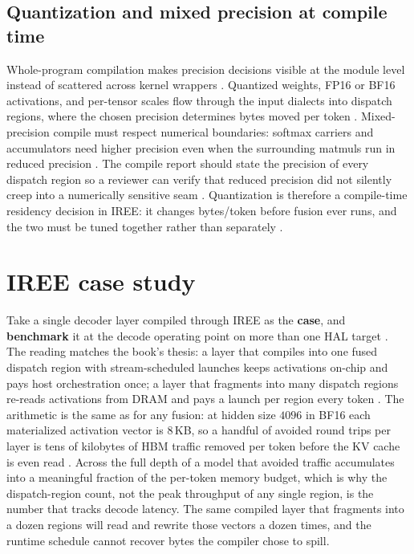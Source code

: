 \subsection{Quantization and mixed precision at compile time}

Whole-program compilation makes precision decisions visible at the module level instead of scattered across kernel wrappers \citep{iree2024,chen2020compilerbasedhardw}. Quantized weights, FP16 or BF16 activations, and per-tensor scales flow through the input dialects into dispatch regions, where the chosen precision determines bytes moved per token \citep{memoryfloor2026,patel2025llminference}. Mixed-precision compile must respect numerical boundaries: softmax carriers and accumulators need higher precision even when the surrounding matmuls run in reduced precision \citep{dao2022flashattention,memoryfloor2026}. The compile report should state the precision of every dispatch region so a reviewer can verify that reduced precision did not silently creep into a numerically sensitive seam \citep{chen2020compilerbasedhardw,patel2025llminference}. Quantization is therefore a compile-time residency decision in IREE: it changes bytes/token before fusion ever runs, and the two must be tuned together rather than separately \citep{iree2024,memoryfloor2026}.

\section{IREE case study}
\label{sec:ch18_iree_case_study}

Take a single decoder layer compiled through IREE as the \textbf{case}, and \textbf{benchmark} it at the decode operating point on more than one HAL target \citep{iree2024,taxbreak2026}. The reading matches the book's thesis: a layer that compiles into one fused dispatch region with stream-scheduled launches keeps activations on-chip and pays host orchestration once; a layer that fragments into many dispatch regions re-reads activations from DRAM and pays a launch per region every token \citep{memoryfloor2026,dao2022flashattention}. The arithmetic is the same as for any fusion: at hidden size $4096$ in BF16 each materialized activation vector is $8\,$KB, so a handful of avoided round trips per layer is tens of kilobytes of HBM traffic removed per token before the KV cache is even read \citep{taxbreak2026}. Across the full depth of a model that avoided traffic accumulates into a meaningful fraction of the per-token memory budget, which is why the dispatch-region count, not the peak throughput of any single region, is the number that tracks decode latency. The same compiled layer that fragments into a dozen regions will read and rewrite those vectors a dozen times, and the runtime schedule cannot recover bytes the compiler chose to spill.

